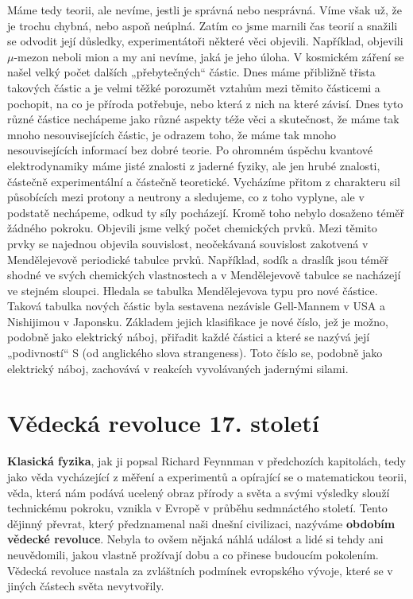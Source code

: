     Máme tedy teorii, ale nevíme, jestli je správná nebo nesprávná. Víme však už, že je trochu 
    chybná, nebo aspoň neúplná. Zatím co jsme marnili čas teorií a snažili se odvodit její 
    důsledky, experimentátoři některé věci objevili. Například, objevili \(\mu\text{-mezon}\) 
    neboli mion a my ani nevíme, jaká je jeho úloha. V kosmickém záření se našel velký počet 
    dalších „přebytečných“ částic. Dnes máme přibližně třista takových částic a je velmi těžké 
    porozumět vztahům mezi těmito částicemi a pochopit, na co je příroda potřebuje, nebo která z 
    nich na které závisí. Dnes tyto různé částice nechápeme jako různé aspekty téže věci a 
    skutečnost, že máme tak mnoho nesouvisejících částic, je odrazem toho, že máme tak mnoho 
    nesouvisejících informací bez dobré teorie. Po ohromném úspěchu kvantové elektrodynamiky máme 
    jisté znalosti z jaderné fyziky, ale jen hrubé znalosti, částečně experimentální a částečně 
    teoretické. Vycházíme přitom z charakteru sil působících mezi protony a neutrony a sledujeme, 
    co z toho vyplyne, ale v podstatě nechápeme, odkud ty síly pocházejí. Kromě toho nebylo 
    dosaženo téměř žádného pokroku. Objevili jsme velký počet chemických prvků. Mezi těmito prvky 
    se najednou objevila souvislost, neočekávaná souvislost zakotvená v Mendělejevově periodické 
    tabulce prvků. Například, sodík a draslík jsou téměř shodné ve svých chemických vlastnostech a 
    v Mendělejevově tabulce se nacházejí ve stejném sloupci. Hledala se tabulka Mendělejevova typu 
    pro nové částice. Taková tabulka nových částic byla sestavena nezávisle Gell-Mannem v USA a 
    Nishijimou v Japonsku. Základem jejich klasifikace je nové číslo, jež je možno, podobně jako 
    elektrický náboj, přiřadit každé částici a které se nazývá její „podivností“ S (od anglického 
    slova strangeness). Toto číslo se, podobně jako elektrický náboj, zachovává v reakcích 
    vyvolávaných jadernými silami.  
  
  \section{Vědecká revoluce 17. století}\label{fyz:IchapIsecVII}
    \textbf{Klasická fyzika}, jak ji popsal Richard Feynnman v předchozích kapitolách, tedy jako
    věda vycházející z měření a experimentů a opírající se o matematickou teorii, věda, která nám
    podává ucelený obraz přírody a světa a svými výsledky slouží technickému pokroku, vznikla v
    Evropě v průběhu sedmnáctého století. Tento dějinný převrat, který předznamenal naši dnešní
    civilizaci, nazýváme \textbf{obdobím vědecké revoluce}. Nebyla to ovšem nějaká náhlá událost a
    lidé si tehdy ani neuvědomili, jakou vlastně prožívají dobu a co přinese budoucím pokolením.
    Vědecká revoluce nastala za zvláštních podmínek evropského vývoje, které se v jiných částech
    světa nevytvořily.

